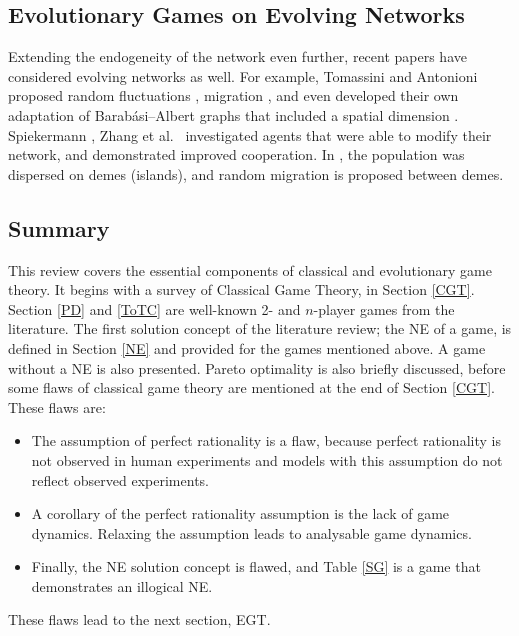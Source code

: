  \subsection{Evolutionary Games on Evolving Networks}
 Extending the endogeneity of the network even further, recent papers have considered evolving networks as well. For example, Tomassini and Antonioni proposed random fluctuations \cite{RN41,RN42}, migration \cite{RN50, RN62}, and even developed their own adaptation of Barab\'{a}si--Albert graphs that included a spatial dimension \cite{RN51}. Spiekermann \cite{RN68}, Zhang et al.~\cite{RN71} investigated agents that were able to modify their network, and demonstrated improved cooperation. In \cite{RN72}, the population was dispersed on demes (islands), and random migration is proposed between demes. \\
 
 






\subsection{Summary}
This review covers the essential components of classical and evolutionary game theory. It begins with a survey of Classical Game Theory, in Section \ref{CGT}. Section \ref{PD} and \ref{ToTC} are well-known 2- and $n$-player games from the literature. The first solution concept of the literature review; the NE of a game, is defined in Section \ref{NE} and provided for the games mentioned above. A game without a NE is also presented. Pareto optimality is also briefly discussed, before some flaws of classical game theory are mentioned at the end of Section \ref{CGT}.  These flaws are:\\

\begin{itemize}
    \item The assumption of perfect rationality is a flaw, because perfect rationality is not observed in human experiments and models with this assumption do not reflect observed experiments. 
    \item A corollary of the perfect rationality assumption is the lack of game dynamics. Relaxing the assumption leads to analysable game dynamics.
    \item  Finally, the NE solution concept is flawed, and Table \ref{SG} is a game that demonstrates an illogical NE.
    
\end{itemize} 
These flaws lead to the next section, EGT.   \\

